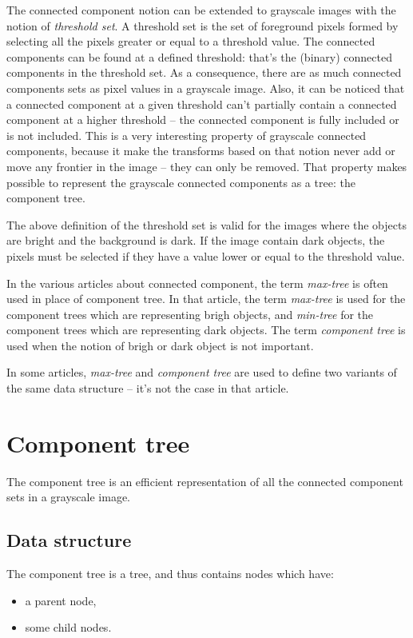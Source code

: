 \documentclass{InsightArticle}
\begin{document}
The connected component notion can be extended to grayscale images with the notion of {\em threshold set}.
A threshold set is the set of foreground pixels formed by selecting all the pixels greater or equal to a threshold value. The connected components can be found at a defined threshold: that's the (binary) connected components in the threshold set. As a consequence, there are as much connected components sets as pixel values in a grayscale image.
Also, it can be noticed that a connected component at a given threshold can't partially contain a connected component at a higher threshold -- the connected component is fully included or is not included. This is a very interesting property of grayscale connected components, because it make the transforms based on that notion never add or move any frontier in the image -- they can only be removed. That property makes possible to represent the grayscale connected components as a tree: the component tree.

The above definition of the threshold set is valid for the images where the objects are bright and the background is dark. If the image contain dark objects, the pixels must be selected if they have a value lower or equal to the threshold value.

In the various articles about connected component, the term {\em max-tree} is often used in place of {component tree}. In that article, the term {\em max-tree} is used for the component trees which are representing brigh objects, and {\em min-tree} for the component trees which are representing dark objects. The term {\em component tree} is used when the notion of brigh or dark object is not important.

In some articles, {\em max-tree} and {\em component tree} are used to define two variants of the same data structure -- it's not the case in that article.

\section{Component tree}

The component tree is an efficient representation of all the connected component sets in a grayscale image.

  \subsection{Data structure}

The component tree is a tree, and thus contains nodes which have:
\begin{itemize}
 \item a parent node,
 \item some child nodes.
\end{itemize}
\end{document}
